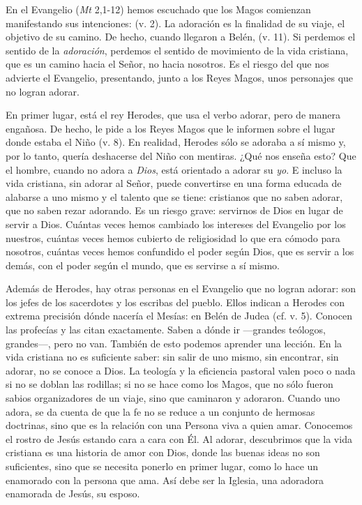 En el Evangelio (\emph{Mt} 2,1-12) hemos escuchado que los Magos comienzan manifestando sus intenciones:  (v. 2). La adoración es la finalidad de su viaje, el objetivo de su camino. De hecho, cuando llegaron a Belén,  (v. 11). Si perdemos el sentido de la \emph{adoración}, perdemos el sentido de movimiento de la vida cristiana, que es un camino hacia el Señor, no hacia nosotros. Es el riesgo del que nos advierte el Evangelio, presentando, junto a los Reyes Magos, unos personajes que no logran adorar.

En primer lugar, está el rey Herodes, que usa el verbo adorar, pero de manera engañosa. De hecho, le pide a los Reyes Magos que le informen sobre el lugar donde estaba el Niño  (v. 8). En realidad, Herodes sólo se adoraba a sí mismo y, por lo tanto, quería deshacerse del Niño con mentiras. ¿Qué nos enseña esto? Que el hombre, cuando no adora a \emph{Dios}, está orientado a adorar su \emph{yo}. E incluso la vida cristiana, sin adorar al Señor, puede convertirse en una forma educada de alabarse a uno mismo y el talento que se tiene: cristianos que no saben adorar, que no saben rezar adorando. Es un riesgo grave: servirnos de Dios en lugar de servir a Dios. Cuántas veces hemos cambiado los intereses del Evangelio por los nuestros, cuántas veces hemos cubierto de religiosidad lo que era cómodo para nosotros, cuántas veces hemos confundido el poder según Dios, que es servir a los demás, con el poder según el mundo, que es servirse a sí mismo.

Además de Herodes, hay otras personas en el Evangelio que no logran adorar: son los jefes de los sacerdotes y los escribas del pueblo. Ellos indican a Herodes con extrema precisión dónde nacería el Mesías: en Belén de Judea (cf. v. 5). Conocen las profecías y las citan exactamente. Saben a dónde ir ---grandes teólogos, grandes---, pero no van. También de esto podemos aprender una lección. En la vida cristiana no es suficiente saber: sin salir de uno mismo, sin encontrar, sin adorar, no se conoce a Dios. La teología y la eficiencia pastoral valen poco o nada si no se doblan las rodillas; si no se hace como los Magos, que no sólo fueron sabios organizadores de un viaje, sino que caminaron y adoraron. Cuando uno adora, se da cuenta de que la fe no se reduce a un conjunto de hermosas doctrinas, sino que es la relación con una Persona viva a quien amar. Conocemos el rostro de Jesús estando cara a cara con Él. Al adorar, descubrimos que la vida cristiana es una historia de amor con Dios, donde las buenas ideas no son suficientes, sino que se necesita ponerlo en primer lugar, como lo hace un enamorado con la persona que ama. Así debe ser la Iglesia, una adoradora enamorada de Jesús, su esposo.

